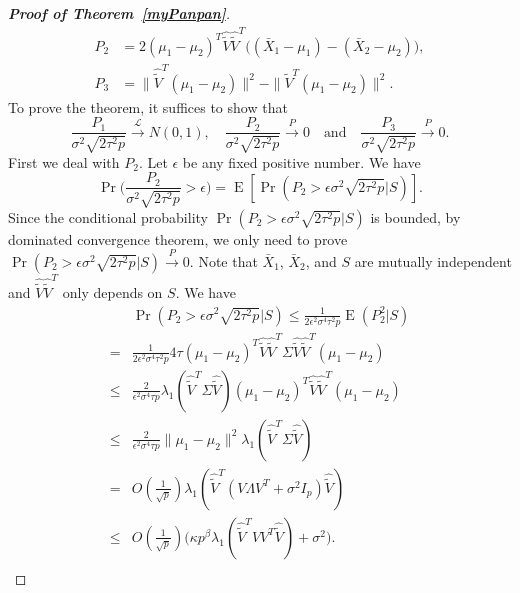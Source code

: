 \documentclass[review]{elsarticle}
\DeclareMathOperator{\myE}{E}
\theoremstyle{plain}
\theoremstyle{definition}
\theoremstyle{remark}
\begin{document}
\begin{proof}[\textbf{Proof of Theorem~\ref{myPanpan}}]
\begin{align*}
    P_2&=2{(\mu_1-\mu_2)}^T \hat{\tilde{V}}\hat{\tilde{V}}^T\big((\bar{X}_1-\mu_1)-(\bar{X}_2-\mu_2)\big),\\
    P_3&=\|\hat{\tilde{V}}^T(\mu_1-\mu_2)\|^2-\|\tilde{V}^T(\mu_1-\mu_2)\|^2.
\end{align*}
To prove the theorem, it suffices to show that
$$
    \frac{P_1}{\sigma^2\sqrt{2\tau^2 p}}\xrightarrow{\mathcal{L}} N(0,1),
    \quad
    \frac{P_2}{\sigma^2\sqrt{2\tau^2 p}}\xrightarrow{P} 0
    \quad
    \textrm{and}
    \quad
    \frac{P_3}{\sigma^2\sqrt{2\tau^2 p}}\xrightarrow{P}0.
    $$
   First we deal with $P_2$.
   Let $\epsilon$ be any fixed positive number. 
   We have
   $$
   \Pr\Big(\frac{P_2}{\sigma^2\sqrt{2\tau^2 p}}>\epsilon\Big)
   =
   \myE[\Pr({P_2}>\epsilon{\sigma^2\sqrt{2\tau^2 p}}\big|S)].
   $$
   Since the conditional probability 
   $
   \Pr({P_2}>\epsilon{\sigma^2\sqrt{2\tau^2 p}}\big|S)
   $
   is bounded, by dominated convergence theorem, we only need to prove
   $\Pr({P_2}>\epsilon{\sigma^2\sqrt{2\tau^2 p}}\big|S)\xrightarrow{P}0$.
    Note that $\bar{X}_1$, $\bar{X}_2$, and $S$ are mutually independent and $\hat{\tilde{V}}\hat{\tilde{V}}^T$ only depends on $S$.
    We have
    \begin{equation*}
        \begin{aligned}
            &\Pr({P_2}>\epsilon{\sigma^2\sqrt{2\tau^2 p}}\big|S)\leq
            \frac{1}{2\epsilon^2\sigma^4\tau^2 p}\myE (P_2^2|S)\\
            =&\frac{1}{2\epsilon^2\sigma^4\tau^2 p} 4\tau {(\mu_1-\mu_2)}^T \hat{\tilde{V}}\hat{\tilde{V}}^T\Sigma \hat{\tilde{V}}\hat{\tilde{V}}^T(\mu_1-\mu_2)\\
            \leq &
            \frac{2}{\epsilon^2\sigma^4\tau p}
             \lambda_1(\hat{\tilde{V}}^T\Sigma \hat{\tilde{V}}) {(\mu_1-\mu_2)}^T \hat{\tilde{V}}\hat{\tilde{V}}^T(\mu_1-\mu_2)\\
            \leq & 
\frac{2}{\epsilon^2\sigma^4\tau p}
             \|\mu_1-\mu_2\|^2
             \lambda_1(\hat{\tilde{V}}^T\Sigma \hat{\tilde{V}})\\
             =&
             O(\frac{1}{\sqrt{p}})
             \lambda_1(\hat{\tilde{V}}^T (V\Lambda V^T +\sigma^2 I_p) \hat{\tilde{V}})\\
             \leq &
             O(\frac{1}{\sqrt{p}})
             \big(\kappa p^{\beta}\lambda_1(\hat{\tilde{V}}^T VV^T  \hat{\tilde{V}})+\sigma^2\big).\\
        \end{aligned}
    \end{equation*}

\end{proof}
\end{document}
